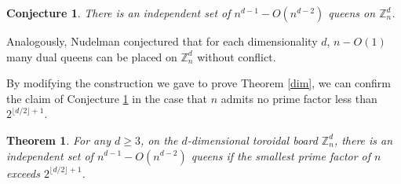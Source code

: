 \documentclass[11pt]{article}
\newtheorem{theorem}[problem]{Theorem}
\newtheorem{conjecture}[problem]{Conjecture}
\begin{document}
\begin{conjecture}\label{dimqueens}
There is an independent set of $n^{d-1}-O(n^{d-2})$ queens on $\mathbb{Z}_n^d$.
\end{conjecture}

Analogously, Nudelman \cite{Nud} conjectured that for each dimensionality $d$, $n-O(1)$ many dual queens can be placed on $\mathbb{Z}_n^d$ without conflict.

By modifying the construction we gave to prove Theorem \ref{dim}, we can confirm the claim of Conjecture \ref{dimqueens} in the case that $n$ admits no prime factor less than $2^{\lfloor d/2\rfloor +1}$.

\begin{theorem}\label{dqueens}
For any $d\ge 3$, on the $d$-dimensional toroidal board $\mathbb{Z}_n^d$, there is an independent set of $n^{d-1}-O(n^{d-2})$ queens if the smallest prime factor of $n$ exceeds $2^{\lfloor d/2\rfloor +1}$.
\end{theorem}
\end{document}
